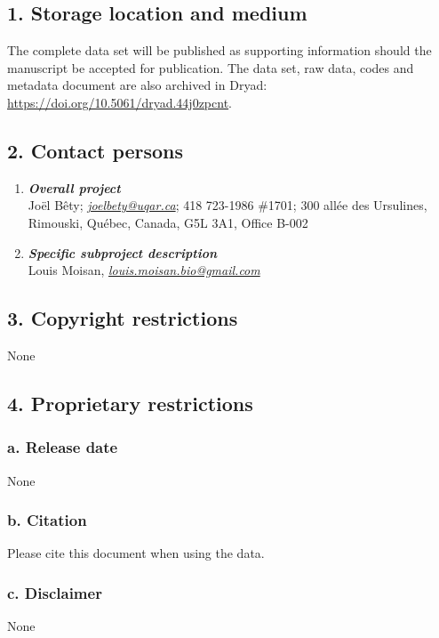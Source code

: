 \documentclass[a4paper,twoside,12pt]{article}
\begin{document}
                \subsection*{1. Storage location and medium}
The complete data set will be published as supporting information should the manuscript be accepted for publication. The data set, raw data, codes and metadata document are also archived in Dryad: \url{https://doi.org/10.5061/dryad.44j0zpcnt}.
                 
        \subsection*{2. Contact persons}
        \begin{enumerate}[label=\alph*.]
                        \item[] \textit{\textbf{Overall project}}\\
                        Joël Bêty; \textit{\href{mailto:joel_bety@uqar.ca}{joel{\textunderscore}bety@uqar.ca}}; 418 723-1986 \#1701; 300 allée des Ursulines, Rimouski, Québec, Canada, G5L 3A1, Office B-002
                        \item[] \textit{\textbf{Specific subproject description}}\\
                         Louis Moisan, \textit{\href{mailto:louis.moisan.bio@gmail.com}{louis.moisan.bio@gmail.com}}
                \end{enumerate}
                \subsection*{3. Copyright restrictions}
                None
                 
                \subsection*{4. Proprietary restrictions}
                        \subsubsection*{a. Release date} None
                        \subsubsection*{b. Citation}
                         Please cite this document when using the data.
                        \subsubsection*{c. Disclaimer} None
                        
\end{document}
